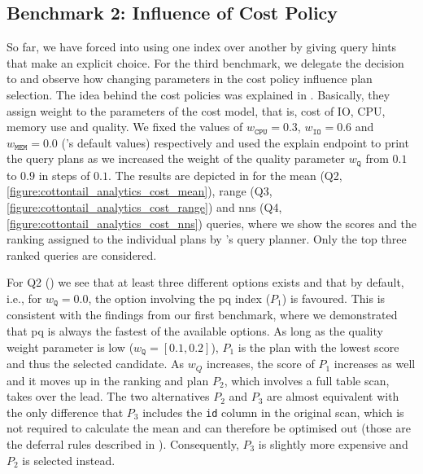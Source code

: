 \subsection{Benchmark 2: Influence of Cost Policy}

So far, we have forced \cottontail{} into using one index over another by giving query hints that make an explicit choice. For the third benchmark, we delegate the decision to \cottontail{} and observe how changing parameters in the cost policy influence plan selection. The idea behind the cost policies was explained in . Basically, they assign weight to the parameters of the cost model, that is, cost of IO, CPU, memory use and quality. We fixed the values of $w_{\mathtt{CPU}} = 0.3$, $w_{\mathtt{IO}} = 0.6$ and $ w_{\mathtt{MEM}} = 0.0$ (\cottontail{}'s default values) respectively and used the explain endpoint to print the query plans as we increased the weight of the quality parameter $w_{\mathtt{Q}}$ from $0.1$ to $0.9$ in steps of $0.1$. The results are depicted in  for the mean (Q2, \ref{figure:cottontail_analytics_cost_mean}), range (Q3, \ref{figure:cottontail_analytics_cost_range}) and \acrshort{nns} (Q4, \ref{figure:cottontail_analytics_cost_nns}) queries, where we show the scores and the ranking assigned to the individual plans by \cottontail{}'s query planner. Only the top three ranked queries are considered.

For Q2 () we see that at least three different options exists and that by default, i.e., for $w_{\mathtt{Q}} = 0.0$, the option involving the \acrshort{pq} index ($P_1$) is favoured. This is consistent with the findings from our first benchmark, where we demonstrated that \acrshort{pq} is always the fastest of the available options. As long as the quality weight parameter is low ($w_{\mathtt{Q}} = [0.1, 0.2]$), $P_1$ is the plan with the lowest score and thus the selected candidate. As $w_Q$ increases, the score of $P_1$ increases as well and it moves up in the ranking and plan $P_2$, which involves a full table scan, takes over the lead. The two alternatives $P_2$ and $P_3$ are almost equivalent with the only difference that $P_3$ includes the \texttt{id} column in the original scan, which is not required to calculate the mean and can therefore be optimised out (those are the deferral rules described in ). Consequently, $P_3$ is slightly more expensive and $P_2$ is selected instead. 

